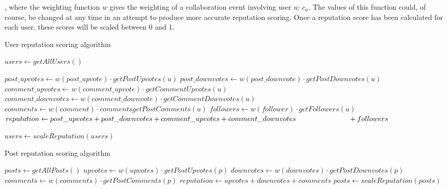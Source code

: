 \noindent
, where the weighting function \(w\) gives the weighting of a collaboration event involving user \(u\): \(c_u\). The values of this function could, of course, be changed at any time in an attempt to produce more accurate reputation scoring. Once a reputation score has been calculated for each user, these scores will be scaled between 0 and 1.

\newcommand{\myindent}[1]{
\newline\makebox[#1cm]{}
}

\begin{algorithm}
\caption{User reputation scoring algorithm}
\label{alg:user-recommendations}
\begin{algorithmic}[1]
\State $users\gets getAllUsers()$
	
	\State $post\_upvotes\gets w(post\_upvote)\cdot getPostUpvotes(u)$
	\State $post\_downvotes\gets w(post\_downvote)\cdot getPostDownvotes(u)$
	\State $comment\_upvotes\gets w(comment\_upvote)\cdot getCommentUpvotes(u)$
	\State $comment\_downvotes\gets w(comment\_downvote)\cdot getCommentDownvotes(u)$
	\State $comments\gets w(comment)\cdot commentsgetPostComments(u)$
	\State $followers\gets w(follower)\cdot getFollowers(u)$
	\State $reputation\gets post\_upvotes + post\_downvotes + comment\_upvotes + comment\_downvotes \myindent{2.6} + followers$
	
\EndFor
\State $users\gets scaleReputation(users)$
\end{algorithmic}
\end{algorithm}

\begin{algorithm}
\caption{Post reputation scoring algorithm}
\label{alg:user-recommendations}
\begin{algorithmic}[1]
\State $posts\gets getAllPosts()$
	\State $upvotes\gets w(upvotes)\cdot getPostUpvotes(p)$
	\State $downvotes\gets w(downvotes)\cdot getPostDownvotes(p)$
	\State $comments\gets w(comments)\cdot getPostComments(p)$
	\State $reputation\gets upvotes + downvotes + comments$
\EndFor
\State $posts\gets scaleReputation(posts)$
\end{algorithmic}
\end{algorithm}
